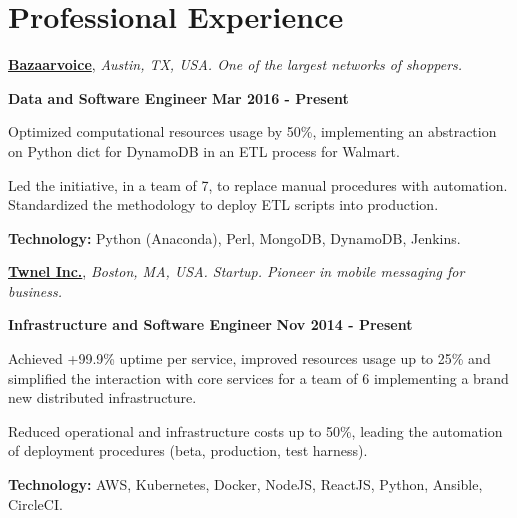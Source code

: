 \section{Professional Experience}
%
\href{http://www.bazaarvoice.com/}{\textbf{Bazaarvoice}}, \textit{Austin, TX,
USA.
One of the largest networks of shoppers.}

\begin{outerlist}
\item[\FA \faAngleDoubleRight] \textbf{Data and Software Engineer}
\hfill
\textbf{Mar 2016 - Present}
\end{outerlist}

\begin{innerlist}
\item Optimized computational resources usage by 50\%, implementing
an abstraction on Python dict for DynamoDB in an ETL process for Walmart.
\item Led the initiative, in a team of 7, to replace manual procedures with
automation.
Standardized the methodology to deploy ETL scripts into production.
\item \textbf{Technology:} Python (Anaconda), Perl, MongoDB, DynamoDB,
Jenkins.
\end{innerlist}

\quarterblankline

\href{http://www.twnel.com/}{\textbf{Twnel Inc.}}, \textit{Boston, MA, USA.
Startup.
Pioneer in mobile messaging for business.}

\begin{outerlist}
\item[\FA \faAngleDoubleRight] \textbf{Infrastructure and Software
Engineer}
\hfill
\textbf{Nov 2014 - Present}
\end{outerlist}

\begin{innerlist}
\item Achieved +99.9\% uptime per
service, improved resources usage up to 25\% and simplified the
interaction with core services for a team of 6 implementing a brand
new distributed infrastructure.
\item Reduced operational and infrastructure costs up to 50\%, leading the
automation of deployment procedures (beta, production, test harness).
\item \textbf{Technology:} AWS, Kubernetes, Docker, NodeJS,
ReactJS, Python, Ansible, CircleCI. %
\end{innerlist}

\quarterblankline

